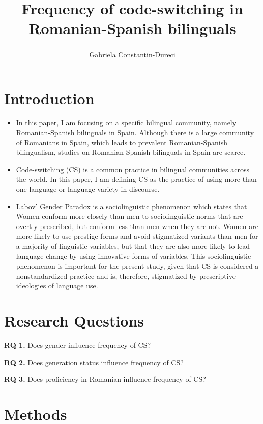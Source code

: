 \documentclass[
  english,
  man]{apa6}
\title{Frequency of code-switching in Romanian-Spanish bilinguals}
\author{Gabriela Constantin-Dureci\textsuperscript{}}
\date{}
\affiliation{\phantom{0}}
\begin{document}
\maketitle

\hypertarget{introduction}{%
\section{Introduction}\label{introduction}}

\begin{itemize}
\item
  In this paper, I am focusing on a specific bilingual community, namely Romanian-Spanish bilinguals in Spain. Although there is a large community of Romanians in Spain, which leads to prevalent Romanian-Spanish bilingualism, studies on Romanian-Spanish bilinguals in Spain are scarce.
\item
  Code-switching (CS) is a common practice in bilingual communities across the world. In this paper, I am defining CS as the practice of using more than one language or language variety in discourse.
\item
  Labov' Gender Paradox is a sociolinguistic phenomenon which states that Women conform more closely than men to sociolinguistic norms that are overtly prescribed, but conform less than men when they are not.
  Women are more likely to use prestige forms and avoid stigmatized variants than men for a majority of linguistic variables, but that they are also more likely to lead language change by using innovative forms of variables.
  This sociolinguistic phenomenon is important for the present study, given that CS is considered a nonstandardized practice and is, therefore, stigmatized by prescriptive ideologies of language use.
\end{itemize}

\hypertarget{research-questions}{%
\section{Research Questions}\label{research-questions}}

\textbf{RQ 1.} Does gender influence frequency of CS?

\textbf{RQ 2.} Does generation status influence frequency of CS?

\textbf{RQ 3.} Does proficiency in Romanian influence frequency of CS?

\hypertarget{methods}{%
\section{Methods}\label{methods}}
\end{document}
